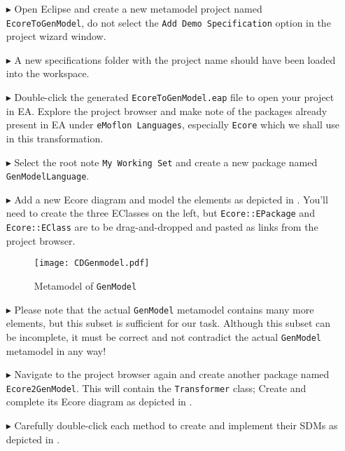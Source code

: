 \begin{enumerate}

\item[$\blacktriangleright$] Open Eclipse and create a new metamodel project named \texttt{Ecore\-To\-Gen\-Model}, do not select the \texttt{Add Demo Specification}
option in the project wizard window.

\item[$\blacktriangleright$] A new specifications folder with the project name should have been loaded into the workspace.

\item[$\blacktriangleright$] Double-click the generated \texttt{Ecore\-To\-Gen\-Model.eap} file to open your project in EA. 
Explore the project browser and make note of the packages already present in EA under \texttt{eMoflon Languages}, especially \texttt{Ecore} which we shall use in this transformation.

\item[$\blacktriangleright$] Select the root note \texttt{My Working Set} and create a new package named \texttt{Gen\-Model\-Language}. 

\item[$\blacktriangleright$] Add a new Ecore diagram and model the elements as depicted in . You'll need to create the three EClasses on
the left, but \texttt{Ecore::EPackage} and \texttt{Ecore::EClass} are to be drag-and-dropped and pasted as links from the project browser. 

\vspace{0.5cm}

\begin{figure}[htbp]
\begin{center}  
	\texttt{[image: CDGenmodel.pdf]}
	\caption{Metamodel of \texttt{GenModel}}  
\label{fig_gMM}
\end{center}
\end{figure} 

\vspace{0.5cm}

\item[$\blacktriangleright$] Please note that the actual \texttt{GenModel} metamodel contains many more elements, but this subset is sufficient for our
task.
Although this subset can be incomplete, it must be correct and not contradict the actual \texttt{GenModel} metamodel in any way!

\item[$\blacktriangleright$] Navigate to the project browser again and create another package named \texttt{Ecore2GenModel}.  
This will contain the \texttt{Transformer} class; Create and complete its Ecore diagram as depicted in .

\item[$\blacktriangleright$] Carefully double-click each method to create and implement their SDMs as depicted in .
\end{enumerate}


